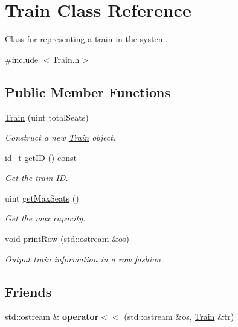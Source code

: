 \hypertarget{classTrain}{}\section{Train Class Reference}
\label{classTrain}


Class for representing a train in the system.  




{\ttfamily \#include $<$Train.\+h$>$}

\subsection*{Public Member Functions}
\begin{DoxyCompactItemize}
\item 
\mbox{\hyperlink{classTrain_aa965be5e5d076d2743301c5d75ce4401}{Train}} (uint total\+Seats)
\begin{DoxyCompactList}\small\item\em Construct a new \mbox{\hyperlink{classTrain}{Train}} object. \end{DoxyCompactList}\item 
id\+\_\+t \mbox{\hyperlink{classTrain_a7310ae0bc5b43ea392e4fa62630ee56b}{get\+ID}} () const
\begin{DoxyCompactList}\small\item\em Get the train ID. \end{DoxyCompactList}\item 
uint \mbox{\hyperlink{classTrain_a93cd372664bac4ba28fa36e40316444a}{get\+Max\+Seats}} ()
\begin{DoxyCompactList}\small\item\em Get the max capacity. \end{DoxyCompactList}\item 
void \mbox{\hyperlink{classTrain_a3fd1c87c2152aa96cc6928f0aea37e21}{print\+Row}} (std\+::ostream \&os)
\begin{DoxyCompactList}\small\item\em Output train information in a row fashion. \end{DoxyCompactList}\end{DoxyCompactItemize}
\subsection*{Friends}
\begin{DoxyCompactItemize}
\item 
\mbox{\label{classTrain_ab4c39558eb319a2f509b128f1fc90bd8}} 
std\+::ostream \& {\bfseries operator$<$$<$} (std\+::ostream \&os, \mbox{\hyperlink{classTrain}{Train}} \&tr)
\end{DoxyCompactItemize}


